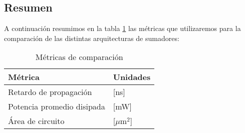 \subsection{Resumen}
A continuación resumimos en la tabla \ref{tabla:metricas} las métricas que utilizaremos para la comparación de las distintas arquitecturas de sumadores:
\begin{table}[h] 
\centering
\begin{tabular}{@{}ll@{}}
\toprule
\textbf{Métrica}  & \textbf{Unidades} \\ \midrule
Retardo de propagación & [ns] \\	
Potencia promedio disipada & [mW] \\
Área de circuito  & [$\mu\textrm{m}^2$] \\ \bottomrule
\end{tabular}
\caption{Métricas de comparación}
\label{tabla:metricas}
\end{table}














